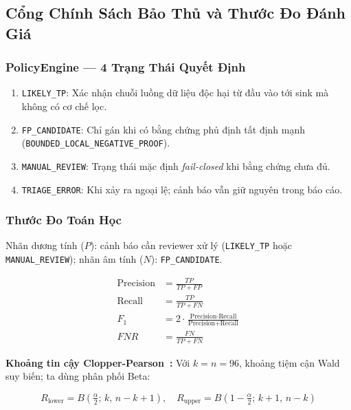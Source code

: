 \documentclass[12pt, a4paper]{article}
\begin{document}
\subsection{Cổng Chính Sách Bảo Thủ và Thước Đo Đánh Giá}

\subsubsection{PolicyEngine --- 4 Trạng Thái Quyết Định}

\begin{enumerate}
  \item \texttt{LIKELY\_TP}: Xác nhận chuỗi luồng dữ liệu độc hại từ
        đầu vào tới sink mà không có cơ chế lọc.
  \item \texttt{FP\_CANDIDATE}: Chỉ gán khi có bằng chứng phủ định tất
        định mạnh (\texttt{BOUNDED\_LOCAL\_NEGATIVE\_PROOF}).
  \item \texttt{MANUAL\_REVIEW}: Trạng thái mặc định \emph{fail-closed}
        khi bằng chứng chưa đủ.
  \item \texttt{TRIAGE\_ERROR}: Khi xảy ra ngoại lệ; cảnh báo vẫn giữ
        nguyên trong báo cáo.
\end{enumerate}

\subsubsection{Thước Đo Toán Học}

Nhãn dương tính ($P$): cảnh báo cần reviewer xử lý (\texttt{LIKELY\_TP}
hoặc \texttt{MANUAL\_REVIEW}); nhãn âm tính ($N$): \texttt{FP\_CANDIDATE}.

\begin{align}
  \text{Precision} &= \frac{TP}{TP + FP} \label{eq:prec} \\[4pt]
  \text{Recall}    &= \frac{TP}{TP + FN} \label{eq:rec}  \\[4pt]
  F_1              &= 2 \cdot \frac{\text{Precision} \cdot \text{Recall}}
                              {\text{Precision} + \text{Recall}} \label{eq:f1} \\[4pt]
  FNR              &= \frac{FN}{TP + FN} \label{eq:fnr}
\end{align}

\noindent\textbf{Khoảng tin cậy Clopper-Pearson~\cite{clopper1934}:}
Với $k = n = 96$, khoảng tiệm cận Wald suy biến; ta dùng phân phối Beta:

\begin{equation}
  R_{\text{lower}} = B\!\left(\tfrac{\alpha}{2};\, k,\, n{-}k{+}1\right),
  \quad
  R_{\text{upper}} = B\!\left(1{-}\tfrac{\alpha}{2};\, k{+}1,\, n{-}k\right)
  \label{eq:cp}
\end{equation}
\end{document}
